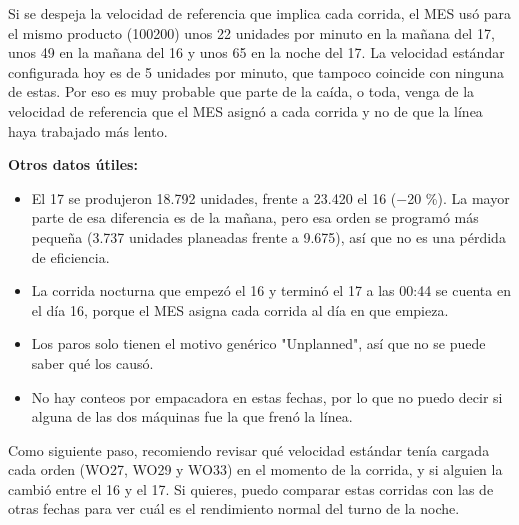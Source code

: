 \begin{singlespace}
{Si se despeja la velocidad de referencia que implica cada corrida, el MES usó para el mismo producto (100200) unos 22 unidades por minuto en la mañana del 17, unos 49 en la mañana del 16 y unos 65 en la noche del 17. La velocidad estándar configurada hoy es de 5 unidades por minuto, que tampoco coincide con ninguna de estas. Por eso es muy probable que parte de la caída, o toda, venga de la velocidad de referencia que el MES asignó a cada corrida y no de que la línea haya trabajado más lento.



\textbf{Otros datos útiles:}

\begin{itemize}[leftmargin=1.2em,itemsep=0pt,topsep=2pt]
\item El 17 se produjeron 18.792 unidades, frente a 23.420 el 16 ($-$20 \%). La mayor parte de esa diferencia es de la mañana, pero esa orden se programó más pequeña (3.737 unidades planeadas frente a 9.675), así que no es una pérdida de eficiencia.
\item La corrida nocturna que empezó el 16 y terminó el 17 a las 00:44 se cuenta en el día 16, porque el MES asigna cada corrida al día en que empieza.
\item Los paros solo tienen el motivo genérico "Unplanned", así que no se puede saber qué los causó.
\item No hay conteos por empacadora en estas fechas, por lo que no puedo decir si alguna de las dos máquinas fue la que frenó la línea.
\end{itemize}



Como siguiente paso, recomiendo revisar qué velocidad estándar tenía cargada cada orden (WO27, WO29 y WO33) en el momento de la corrida, y si alguien la cambió entre el 16 y el 17. Si quieres, puedo comparar estas corridas con las de otras fechas para ver cuál es el rendimiento normal del turno de la noche.}

\end{singlespace}
